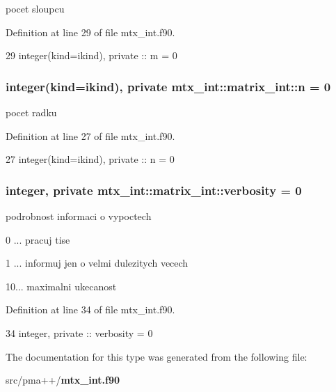 pocet sloupcu 



Definition at line 29 of file mtx\+\_\+int.\+f90.


\begin{DoxyCode}
29     \textcolor{keywordtype}{integer(kind=ikind)}, \textcolor{keywordtype}{private} :: m = 0
\end{DoxyCode}
\subsubsection[{n}]{\setlength{\rightskip}{0pt plus 5cm}integer(kind=ikind), private mtx\+\_\+int\+::matrix\+\_\+int\+::n = 0\hspace{0.3cm}{\ttfamily [private]}}\label{structmtx__int_1_1matrix__int_ac2994241a34304798507e3389168f171}


pocet radku 



Definition at line 27 of file mtx\+\_\+int.\+f90.


\begin{DoxyCode}
27     \textcolor{keywordtype}{integer(kind=ikind)}, \textcolor{keywordtype}{private} :: n = 0
\end{DoxyCode}
\subsubsection[{verbosity}]{\setlength{\rightskip}{0pt plus 5cm}integer, private mtx\+\_\+int\+::matrix\+\_\+int\+::verbosity = 0\hspace{0.3cm}{\ttfamily [private]}}\label{structmtx__int_1_1matrix__int_ac69bb1fa94281e82bdaee4bf34cb375d}


podrobnost informaci o vypoctech 


\begin{DoxyItemize}
\item 0 ... pracuj tise
\item 1 ... informuj jen o velmi dulezitych vecech
\item 10... maximalni ukecanost 
\end{DoxyItemize}

Definition at line 34 of file mtx\+\_\+int.\+f90.


\begin{DoxyCode}
34     \textcolor{keywordtype}{integer}, \textcolor{keywordtype}{private} :: verbosity = 0
\end{DoxyCode}


The documentation for this type was generated from the following file\+:\begin{DoxyCompactItemize}
\item 
src/pma++/{\bf mtx\+\_\+int.\+f90}\end{DoxyCompactItemize}
